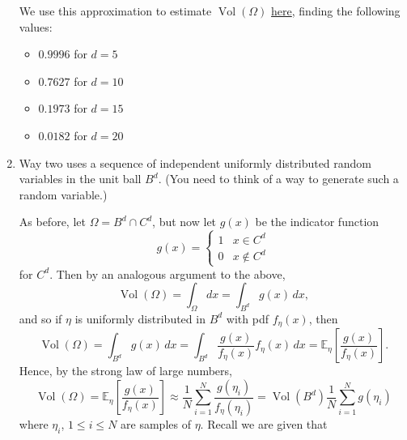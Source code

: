 \documentclass{../kin_math}
\begin{document}
\begin{questions}
\begin{enumerate}[label=\arabic*.]
\begin{solution}
\begin{equation*}
      \end{equation*}
      We use this approximation to estimate $\operatorname{Vol}(\Omega)$ \href{https://github.com/elijahkin/amsc660/blob/main/final/final.ipynb}{here}, finding the following values:
      \begin{itemize}
        \item $0.9996$ for $d = 5$
        \item $0.7627$ for $d = 10$
        \item $0.1973$ for $d = 15$
        \item $0.0182$ for $d = 20$
      \end{itemize}
    \end{solution}
    \item Way two uses a sequence of independent uniformly distributed random variables in the unit ball $B^d$. (You need to think of a way to generate such a random variable.)
    \begin{solution}
      As before, let $\Omega = B^d \cap C^d$, but now let $g(x)$ be the indicator function
      \begin{equation*}
        g(x) = \begin{cases} 1 & x \in C^d \\ 0 & x \notin C^d \end{cases}
      \end{equation*}
      for $C^d$. Then by an analogous argument to the above,
      \begin{equation*}
        \operatorname{Vol}(\Omega) = \int_\Omega dx = \int_{B^d} g(x) \, dx,
      \end{equation*}
      and so if $\eta$ is uniformly distributed in $B^d$ with pdf $f_\eta(x)$, then
      \begin{equation*}
        \operatorname{Vol}(\Omega) = \int_{B^d} g(x) \, dx = \int_{B^d} \frac{g(x)}{f_\eta(x)} f_\eta(x) \, dx = \mathbb{E}_\eta \left[\frac{g(x)}{f_\eta(x)}\right].
      \end{equation*}
      Hence, by the strong law of large numbers,
      \begin{equation*}
        \operatorname{Vol}(\Omega) = \mathbb{E}_\eta \left[\frac{g(x)}{f_\eta(x)}\right] \approx \frac{1}{N} \sum_{i = 1}^N \frac{g(\eta_i)}{f_\eta(\eta_i)} = \operatorname{Vol}(B^d) \frac{1}{N} \sum_{i = 1}^N g(\eta_i)
      \end{equation*}
      where $\eta_i$, $1 \leq i \leq N$ are samples of $\eta$. Recall we are given that
      \begin{equation*}

\end{equation*}
\end{solution}
\end{enumerate}
\end{questions}
\end{document}
